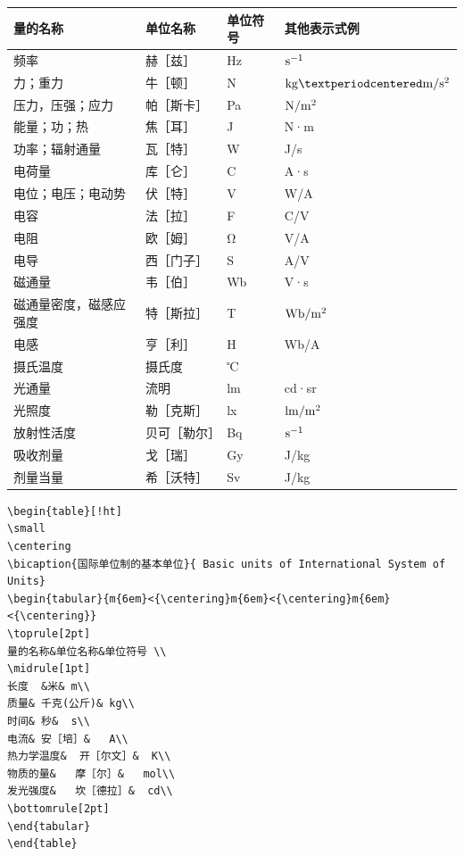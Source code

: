 \begin{table}[!ht]
	\small
	\centering
	\begin{tabular}{m{8em}<{\centering}m{6em}<{\centering}m{4em}<{\centering}m{6em}<{\centering}} 
		\toprule[2pt]
		量的名称&单位名称&单位符号&其他表示式例 \\
		\midrule[1pt]
		频率&赫［兹］&Hz&$\rm{s^{-1}}$\\
		力；重力&牛［顿］&N&$\rm{kg·m/s^2}$\\
		压力，压强；应力&	帕［斯卡］&	Pa&$\rm{N/m^2}$\\
		能量；功；热	&焦［耳］&	J&	N·m\\
		功率；辐射通量&	瓦［特］&	W&	J/s\\
		电荷量	&库［仑］&	C&	A·s\\
		电位；电压；电动势&	伏［特］&	V&	W/A\\
		电容&	法［拉］&	F&	C/V\\
		电阻&	欧［姆］&	Ω&	V/A\\
		电导&	西［门子］&	S&	A/V\\
		磁通量	&韦［伯］&	Wb&	V·s\\
		磁通量密度，磁感应强度	&特［斯拉］&	T&$	\rm{Wb/m^2}$\\
		电感&	亨［利］&	H&	Wb/A\\
		摄氏温度&	摄氏度&	℃	&   \\
		光通量&	流明&	lm&	cd·sr\\
		光照度	&勒［克斯］&	lx&	$\rm{lm/m^2}$\\
		放射性活度&	贝可［勒尔］&	Bq&$\rm{s^{-1}}$\\
		吸收剂量&	戈［瑞］&	Gy&	J/kg\\
		剂量当量&	希［沃特］&	Sv&	J/kg\\
		\bottomrule[2pt]
	\end{tabular}
\end{table}
\begin{lstlisting}[caption={表3.4绘制代码}]
\begin{table}[!ht]
\small
\centering
\bicaption{国际单位制的基本单位}{ Basic units of International System of Units} 
\begin{tabular}{m{6em}<{\centering}m{6em}<{\centering}m{6em}<{\centering}}
\toprule[2pt]
量的名称&单位名称&单位符号 \\
\midrule[1pt]
长度	&米&	m\\
质量&	千克(公斤)&	kg\\
时间&	秒&	s\\
电流&	安［培］&	A\\
热力学温度&	开［尔文］&	K\\
物质的量&	摩［尔］&	mol\\
发光强度&	坎［德拉］&	cd\\
\bottomrule[2pt]
\end{tabular}
\end{table}
\end{lstlisting}
